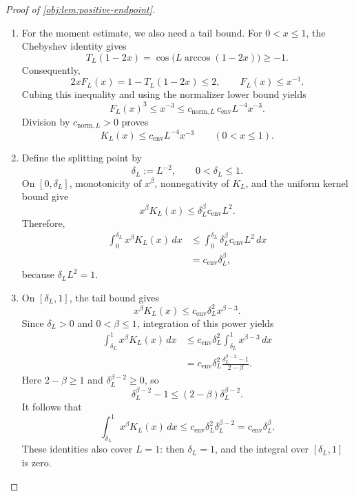 \begin{proof}[Proof of \cref{obj:lem:positive-endpoint}]
\begin{enumerate}
\item For the moment estimate, we also need a tail bound. For \(0<x\le1\), the Chebyshev identity gives
\[
T_L(1-2x)
=
\cos\!\bigl(L\arccos(1-2x)\bigr)
\ge-1.
\]
Consequently,
\[
2xF_L(x)=1-T_L(1-2x)\le2,
\qquad
F_L(x)\le x^{-1}.
\]
Cubing this inequality and using the normalizer lower bound yields
\[
F_L(x)^3
\le x^{-3}
\le c_{\mathrm{norm},L}\,c_{\mathrm{env}}L^{-4}x^{-3}.
\]
Division by \(c_{\mathrm{norm},L}>0\) proves
\[
K_L(x)\le c_{\mathrm{env}}L^{-4}x^{-3}
\qquad(0<x\le1).
\]

\item Define the splitting point by
\[
\delta_L:=L^{-2},
\qquad
0<\delta_L\le1.
\]
On \([0,\delta_L]\), monotonicity of \(x^\beta\), nonnegativity of \(K_L\), and the uniform kernel bound give
\[
x^\beta K_L(x)
\le
\delta_L^\beta c_{\mathrm{env}}L^2.
\]
Therefore,
\[
\begin{aligned}
\int_0^{\delta_L}x^\beta K_L(x)\,dx
&\le
\int_0^{\delta_L}
\delta_L^\beta c_{\mathrm{env}}L^2\,dx\\
&=
c_{\mathrm{env}}\delta_L^\beta,
\end{aligned}
\]
because \(\delta_LL^2=1\).

\item On \([\delta_L,1]\), the tail bound gives
\[
x^\beta K_L(x)
\le
c_{\mathrm{env}}\delta_L^2x^{\beta-3}.
\]
Since \(\delta_L>0\) and \(0<\beta\le1\), integration of this power yields
\[
\begin{aligned}
\int_{\delta_L}^1x^\beta K_L(x)\,dx
&\le
c_{\mathrm{env}}\delta_L^2
\int_{\delta_L}^1x^{\beta-3}\,dx\\
&=
c_{\mathrm{env}}\delta_L^2
\frac{\delta_L^{\beta-2}-1}{2-\beta}.
\end{aligned}
\]
Here \(2-\beta\ge1\) and \(\delta_L^{\beta-2}\ge0\), so
\[
\delta_L^{\beta-2}-1
\le
(2-\beta)\delta_L^{\beta-2}.
\]
It follows that
\[
\int_{\delta_L}^1x^\beta K_L(x)\,dx
\le
c_{\mathrm{env}}\delta_L^2\delta_L^{\beta-2}
=
c_{\mathrm{env}}\delta_L^\beta.
\]
These identities also cover \(L=1\): then \(\delta_L=1\), and the integral over \([\delta_L,1]\) is zero.


\end{enumerate}
\end{proof}
